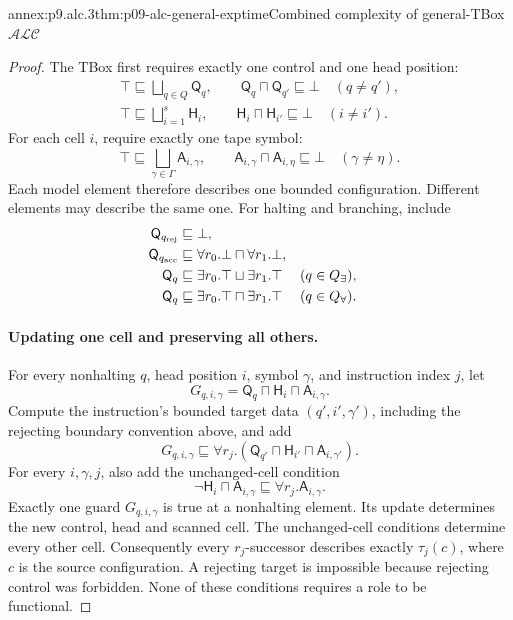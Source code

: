 \begin{annexitem}{annex:p9.alc.3}{thm:p09-alc-general-exptime}{Combined complexity of general-TBox \(\mathcal{ALC}\)}
\begin{proof}
The TBox first requires exactly one control and one head position:
\[
\begin{gathered}
 \top\sqsubseteq\bigsqcup_{q\in Q}\mathsf Q_q,\qquad
 \mathsf Q_q\sqcap\mathsf Q_{q'}\sqsubseteq\bot\quad(q\ne q'),\\
 \top\sqsubseteq\bigsqcup_{i=1}^{s}\mathsf H_i,\qquad
 \mathsf H_i\sqcap\mathsf H_{i'}\sqsubseteq\bot\quad(i\ne i').
\end{gathered}
\]
For each cell \(i\), require exactly one tape symbol:
\[
 \top\sqsubseteq\bigsqcup_{\gamma\in\Gamma}\mathsf A_{i,\gamma},
 \qquad
 \mathsf A_{i,\gamma}\sqcap\mathsf A_{i,\eta}\sqsubseteq\bot
                                      \quad(\gamma\ne\eta).
\]
Each model element therefore describes one bounded configuration.
Different elements may describe the same one.
For halting and branching, include
\[
\begin{aligned}
 \mathsf Q_{q_{\rm rej}}&\sqsubseteq\bot,\\
 \mathsf Q_{q_{\rm acc}}&\sqsubseteq
                   \forall r_0.\bot\sqcap\forall r_1.\bot,\\
 \mathsf Q_q&\sqsubseteq
                   \exists r_0.\top\sqcup\exists r_1.\top
                         &&(q\in Q_\exists),\\
 \mathsf Q_q&\sqsubseteq
                   \exists r_0.\top\sqcap\exists r_1.\top
                         &&(q\in Q_\forall).
\end{aligned}
\]

\paragraph{Updating one cell and preserving all others.}
For every nonhalting \(q\), head position \(i\), symbol \(\gamma\),
and instruction index \(j\), let
\[
 G_{q,i,\gamma}
       =\mathsf Q_q\sqcap\mathsf H_i\sqcap\mathsf A_{i,\gamma}.
\]
Compute the instruction's bounded target data \((q',i',\gamma')\),
including the rejecting boundary convention above, and add
\[
 G_{q,i,\gamma}\sqsubseteq
       \forall r_j.(\mathsf Q_{q'}\sqcap\mathsf H_{i'}
                                      \sqcap\mathsf A_{i,\gamma'}).
\]
For every \(i,\gamma,j\), also add the unchanged-cell condition
\[
 \neg\mathsf H_i\sqcap\mathsf A_{i,\gamma}
                     \sqsubseteq\forall r_j.\mathsf A_{i,\gamma}.
\]
Exactly one guard \(G_{q,i,\gamma}\) is true at a nonhalting element.
Its update determines the new control, head and scanned cell.
The unchanged-cell conditions determine every other cell.
Consequently every \(r_j\)-successor describes exactly
\(\tau_j(c)\), where \(c\) is the source configuration.
A rejecting target is impossible because rejecting control was
forbidden.  None of these conditions requires a role to be functional.


\end{proof}
\end{annexitem}
